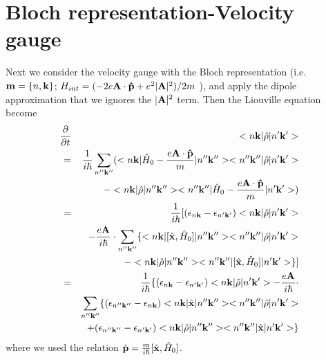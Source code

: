 \documentclass[aps,prb,preprint]{revtex4-1}
\begin{document}
\section{Bloch representation-Velocity gauge}
\label{sec:BV}
Next we consider the velocity gauge with the Bloch representation (i.e. ${\bf m} = \{n, {\bf k}\}$; $H_{int} =( - 2e{\bf A} \cdot {\bf \hat{p}} + e^2 |{\bf A}|^2)/2m$ ), and apply the dipole approximation that we ignores the |${\bf A}|^2$ term. Then the Liouville equation become 
\begin{eqnarray*}
\frac{ \partial }{\partial t } &&<n{\bf k}| \hat{\rho} |n'{\bf k'}> \\
= && \frac{1}{i \hbar}  \sum_{n''{\bf k''}} ( <n{\bf k}| \hat{H}_0 - \frac{e{\bf A} \cdot {\bf \hat{p}} }{m} |n''{\bf k''}><n''{\bf k''}| \hat{\rho} |n'{\bf k'}> \\
&&- <n{\bf k}| \hat{\rho} |n''{\bf k''}><n''{\bf k''}| \hat{H}_0 - \frac{e{\bf A} \cdot {\bf \hat{p}} }{m}  |n'{\bf k'}> )\\
= &&\frac{1}{i \hbar} [ (\epsilon_{n{\bf k}}-\epsilon_{n'{\bf k'}}) <n{\bf k}| \hat{\rho} |n'{\bf k'}> \\
&& -\frac{e{\bf A}}{i \hbar} \cdot \sum_{n''{\bf k''}} \{ <n{\bf k}|[ \hat{\bf x},\hat{H}_0] |n''{\bf k''}> <n''{\bf k''}| \hat{\rho} |n'{\bf k'}>\\ 
&& - <n{\bf k}| \hat{\rho} |n''{\bf k''}><n''{\bf k''}|[ \hat{\bf x},\hat{H}_0] |n'{\bf k'}> \} ] \\
= &&\frac{1}{i \hbar} \{ (\epsilon_{n{\bf k}}-\epsilon_{n'{\bf k'}}) <n{\bf k}| \hat{\rho} |n'{\bf k'}> -\frac{e{\bf A}}{i \hbar} \cdot  \\
&& \sum_{n''{\bf k''}} \{ (\epsilon_{n''{\bf k''}}-\epsilon_{n{\bf k}})  <n{\bf k}| \hat{\bf x} |n''{\bf k''}> <n''{\bf k''}| \hat{\rho} |n'{\bf k'}>\\ 
&&+ (\epsilon_{n''{\bf k''}}-\epsilon_{n'{\bf k'}}) <n{\bf k}| \hat{\rho} |n''{\bf k''}><n''{\bf k''}| \hat{\bf x} |n'{\bf k'}> \} 
\end{eqnarray*}
where we used the relation $\hat{\bf p} = \frac{m}{i \hbar}[\hat{\bf x},\hat{H}_0]$.
\end{document}
